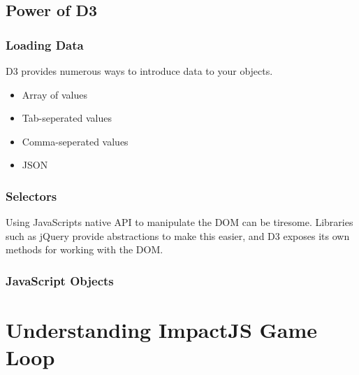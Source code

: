 \documentclass[red]{beamer}
\begin{document}
\subsection{Power of D3}

\begin{frame}
  \frametitle{Loading Data}   %
  D3 provides numerous ways to introduce data to your objects. 
  \begin{itemize}
  \item<1-> Array of values
  \item<2-> Tab-seperated values
  \item<3-> Comma-seperated values
  \item<4-> JSON
  \end{itemize}
\end{frame}

\begin{frame}
	\frametitle{Selectors}
    Using JavaScripts native API to manipulate the DOM can be tiresome. Libraries such as jQuery provide abstractions to make this easier, and D3 exposes its own methods for working with the DOM. 

\end{frame}

\begin{frame}
 	\frametitle{JavaScript Objects}
		\lstI
\end{frame}

\section{Understanding ImpactJS Game Loop}
\end{document}
